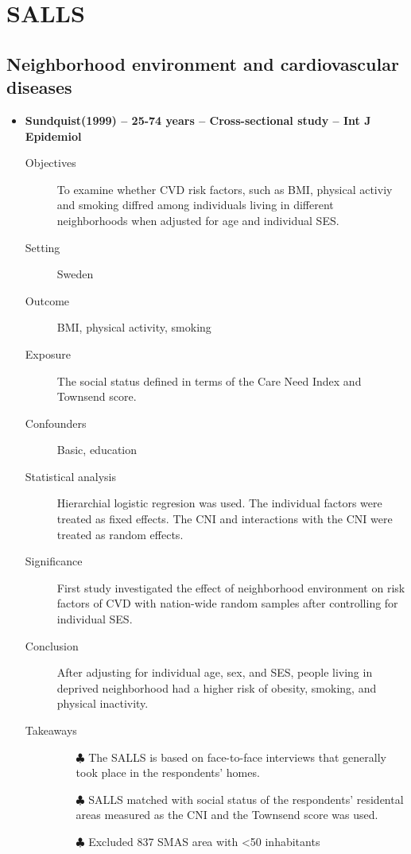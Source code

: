 \documentclass{article}
\begin{document}
\section{SALLS}
\subsection{Neighborhood environment and cardiovascular diseases}
\begin{itemize}
	\item{\bf Sundquist(1999) -- 25-74 years -- Cross-sectional study -- Int J Epidemiol} 
		\begin{description}
			\item[Objectives]
				To examine whether CVD risk factors, such as BMI, physical activiy and smoking diffred among individuals living in different neighborhoods when adjusted for age and individual SES.
			\item[Setting] 
				Sweden 
			\item[Outcome]
				BMI, physical activity, smoking
			\item[Exposure] 
				The social status defined in terms of the Care Need Index and Townsend score.
			\item[Confounders] 
				Basic, education
			\item[Statistical analysis] 
				Hierarchial logistic regresion was used. The individual factors were treated as fixed effects. The CNI and interactions with the CNI were treated as random effects.
			\item[Significance] 
				First study investigated the effect of neighborhood environment on risk factors of CVD with nation-wide random samples after controlling for individual SES. 
			\item[Conclusion] 
				After adjusting for individual age, sex, and SES, people living in deprived neighborhood had a higher risk of obesity, smoking, and physical inactivity.
			\item[Takeaways] \mbox{}\par
				\begin{itemize}
					\item[$\clubsuit$] The SALLS is based on face-to-face interviews that generally took place in the respondents' homes.
					\item[$\clubsuit$] SALLS matched with social status of the respondents' residental areas measured as the CNI and the Townsend score was used.
					\item[$\clubsuit$] Excluded 837 SMAS area with <50 inhabitants
				\end{itemize}
		\end{description}


\end{itemize}
\end{document}
